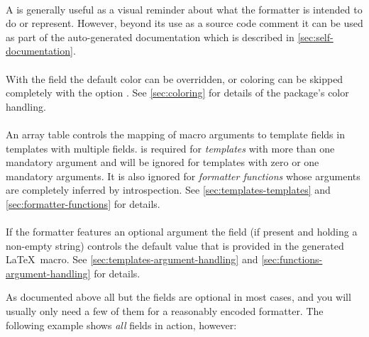 \documentclass{scrartcl}
\begin{document}
\paragraph{}

A  is generally useful as a visual reminder about what the
formatter is intended to do or represent.  However, beyond its use as a source
code comment it can be used as part of the auto-generated documentation which is
described in \vref{sec:self-documentation}.


\paragraph{}

With the  field the default color can be overridden, or coloring
can be skipped completely with the option .  See
\vref{sec:coloring} for details of the package's color handling.


\paragraph{}

An array table  controls the mapping of macro arguments to template
fields in templates with multiple fields.   is required for
\emph{templates} with more than one mandatory argument and will be ignored for
templates with zero or one mandatory arguments.  It is also ignored for
\emph{formatter functions} whose arguments are completely inferred by
introspection.  See \vref{sec:templates-templates} and
\vref{sec:formatter-functions} for details.


\paragraph{}

If the formatter features an optional argument the  field (if
present and holding a non-empty string) controls the default value that is
provided in the generated \LaTeX\ macro.  See
\vref{sec:templates-argument-handling} and
\vref{sec:functions-argument-handling} for details.

\bigskip

As documented above all but the  fields are optional in most cases,
and you will usually only need a few of them for a reasonably encoded formatter.
The following example shows \emph{all} fields in action, however:
\end{document}
